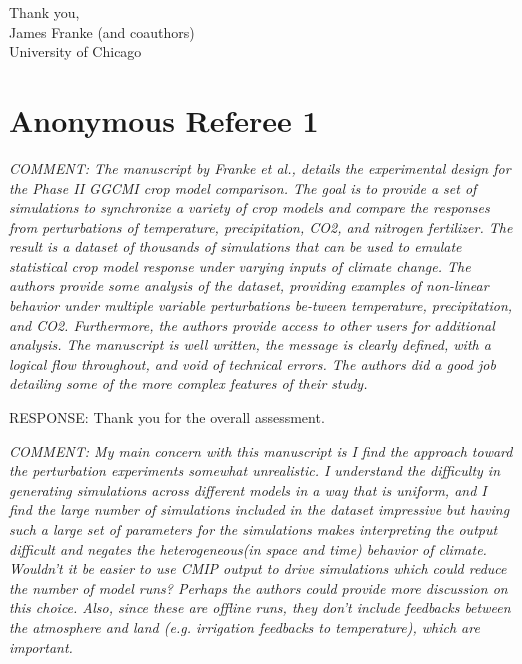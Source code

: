 \documentclass[gmd, manuscript]{copernicus} %
\begin{document}
\medskip

\begin{flushright}
\noindent Thank you,\\
James Franke (and coauthors)\\
University of Chicago\\
\end{flushright}



\clearpage
\section{Anonymous Referee 1}

\textcolor{dark-gray}{\textit{COMMENT: The manuscript by Franke et al., details the experimental design for the Phase II GGCMI crop model comparison. The goal is to provide a set of simulations to synchronize a variety of crop models and compare the responses from perturbations of temperature, precipitation, CO2, and nitrogen fertilizer. The result is a dataset of thousands of simulations that can be used to emulate statistical crop model response under varying inputs of climate change. The authors provide some analysis of the dataset, providing examples of non-linear behavior under multiple variable perturbations be-tween temperature, precipitation, and CO2. Furthermore, the authors provide access to other users for additional analysis. The manuscript is well written, the message is clearly defined, with a logical flow throughout, and void of technical errors. The authors did a good job detailing some of the more complex features of their study.}} 

RESPONSE: Thank you for the overall assessment.
\smallskip

\textcolor{dark-gray}{\textit{COMMENT: My main concern with this manuscript is I find the approach toward the perturbation experiments somewhat unrealistic. I understand the difficulty in generating simulations across different models in a way that is uniform, and I find the large number of simulations included in the dataset impressive but having such a large set of parameters for the simulations makes interpreting the output difficult and negates the heterogeneous(in space and time) behavior of climate. Wouldn’t it be easier to use CMIP output to drive simulations which could reduce the number of model runs? Perhaps the authors could provide more discussion on this choice. Also, since these are offline runs, they don’t include feedbacks between the atmosphere and land (e.g. irrigation feedbacks to temperature), which are important.}}
\end{document}
